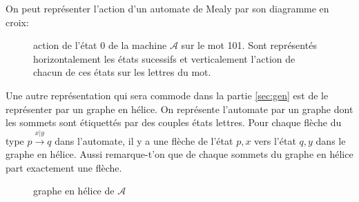 \documentclass[11pt,a4paper]{article}
\begin{document}
On peut représenter l'action d'un automate de Mealy par son diagramme en croix:

\begin{figure}[!ht]
  \begin{center}
    \caption{action de l'état 0 de la machine $\mathcal{A}$ sur le mot 101. Sont représentés horizontalement les états sucessifs et verticalement l'action de chacun de ces états sur les lettres du mot.}
  \end{center}
\end{figure}

Une autre représentation qui sera commode dans la partie \ref{sec:gen} est de le représenter par un graphe en hélice. On représente l'automate par un graphe dont les sommets sont étiquettés par des couples états lettres. Pour chaque flèche du type $p\overset{x|y}{\longrightarrow}q$ dans l'automate, il y a une flèche de l'état $p, x$ vers l'état $q, y$ dans le graphe en hélice. Aussi remarque-t'on que de chaque sommets du graphe en hélice part exactement une flèche.

\begin{figure}[!ht]
  \begin{center}
    \caption{graphe en hélice de $\mathcal{A}$}
  \end{center}
\end{figure}
\end{document}
